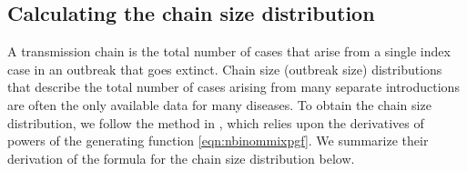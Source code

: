 \documentclass{imammb}
\numberwithin{equation}{section}
\begin{document}

\subsection{Calculating the chain size distribution}

A transmission chain is the total number of cases that arise from a single index case in an outbreak that goes extinct. Chain size (outbreak size) distributions that describe the total number of cases arising from many separate introductions are often the only available data for many diseases.  To obtain the chain size distribution, we follow the method in \citet{Blumberg2013-xv}, which relies upon the derivatives of powers of the generating function \eqref{eqn:nbinommixpgf}. We summarize their derivation of the formula for the chain size distribution below. 

\end{document}
